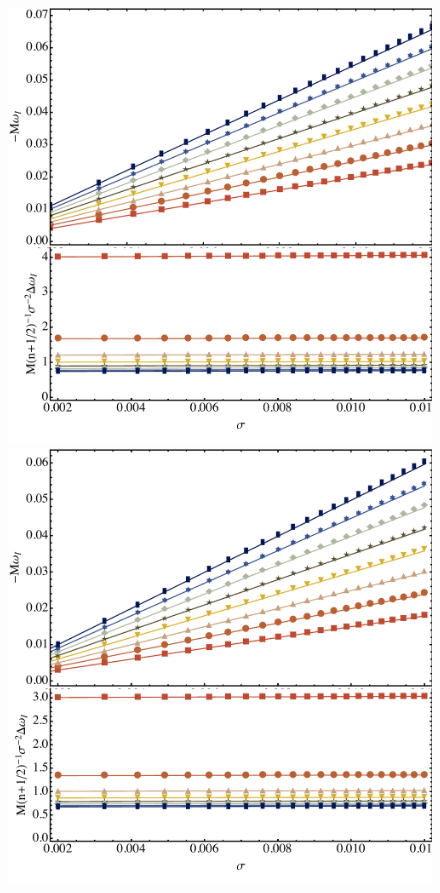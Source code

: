\begin{refsection}
\begin{figure}[tb]
\includegraphics[width =1.0 \columnwidth]{chapter_extremal/etc/Quads1L2.pdf} 
\includegraphics[width =1.0 \columnwidth]{chapter_extremal/etc/Quads2L3.pdf}

\end{figure}
\end{refsection}
